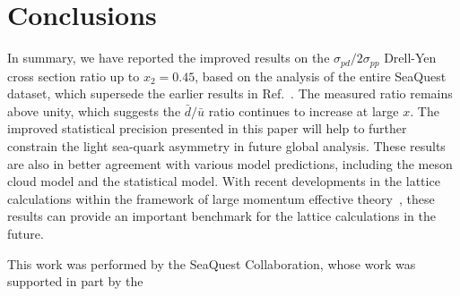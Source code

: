 \documentclass[reprint,aps,unsortedaddress,superscriptaddress,prl,floatfix,showpacs,linenumbers,final]{revtex4-2}
\begin{document}

\section{Conclusions}
\label{sec:Conclusions}
In summary, we have reported the improved results on the $\sigma_{pd}/2\sigma_{pp}$ Drell-Yen cross section ratio up to $x_2=0.45$,
based on the analysis of the entire SeaQuest dataset, which supersede the earlier results in Ref.~\cite{dove2021,dove2023}.
The measured ratio remains above unity, which suggests the $\bar{d}/\bar{u}$ ratio continues to increase at large $x$.
The improved statistical precision presented in this paper will help to further constrain the light sea-quark asymmetry in future global analysis.
These results are also in better agreement with various model predictions, including the meson cloud model and the statistical model.
With recent developments in the lattice calculations within the framework of large momentum effective theory~\cite{constantinou2021},
these results can provide an important benchmark for the lattice calculations in the future.
\begin{acknowledgments}
	This work was performed by the SeaQuest Collaboration, whose work was supported in part by the
\end{acknowledgments}

\end{document}
